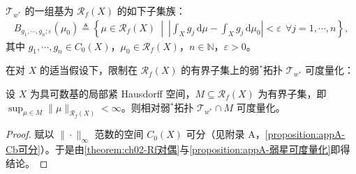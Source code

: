 \documentclass[../../main.tex]{subfiles}%
\begin{document}
$\mathcal{T}_{w^*}$ 的一组基为 $\mathscr{R}_f(X)$ 的如下子集族：
\begin{align}
B_{g_1,\cdots ,g_n;\varepsilon}(\mu_0)
\triangleq \left\{\mu\in\mathscr{R}_f(X)\ \middle|\
\left|\int_X g_j\,\mathrm{d}\mu-\int_X g_j\,\mathrm{d}\mu_0\right|<\varepsilon
\ \ \forall j=1,\cdots ,n\right\},\label{align:ch05-5.2}
\end{align}
其中 $g_1,\cdots ,g_n\in C_0(X)$，$\mu_0\in\mathscr{R}_f(X)$，$n\in\mathbb{N}$，$\varepsilon>0$。

在对 $X$ 的适当假设下，限制在 $\mathscr{R}_f(X)$ 的有界子集上的弱$^*$拓扑 $\mathcal{T}_{w^*}$ 可度量化：

\begin{proposition}\label{proposition:ch05-弱星可度量化}

设 $X$ 为具可数基的局部紧 Hausdorff 空间，$M\subseteq\mathscr{R}_f(X)$ 为有界子集，即 $\sup_{\mu\in M}\|\mu\|_{\mathscr{R}_f(X)}<\infty$。则相对弱$^*$拓扑 $\mathcal{T}_{w^*}\cap M$ 可度量化。
\end{proposition}

\begin{proof}
赋以 $\|\cdot\|_\infty$ 范数的空间 $C_0(X)$ 可分（见附录 A，\cref{proposition:appA-Cb可分}）。于是由\cref{theorem:ch02-Rf对偶}与\cref{proposition:appA-弱星可度量化}即得结论。
\end{proof}
\end{document}
